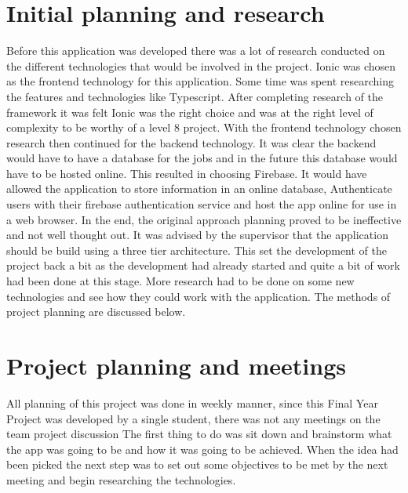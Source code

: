\section{Initial planning and research}
Before this application was developed there was a lot of research conducted on the different technologies that would be involved in the project. Ionic was chosen as the frontend technology for this application. Some time was spent researching the features and technologies like Typescript. After completing research of the framework it was felt Ionic was the right choice and was at the right level of complexity to be worthy of a level 8 project.
With the frontend technology chosen research then continued for the backend technology. It was clear the backend would have to have a database for the jobs and in the future this database would have to be hosted online. This resulted in choosing Firebase. It would have allowed the application to store information in an online database, Authenticate users with their firebase authentication service and host the app online for use in a web browser.
In the end, the original approach planning proved to be ineffective and not well thought out. It was advised by the supervisor that the application should be build using a three tier architecture. This set the development of the project back a bit  as the development had already started and quite a bit of work had been done at this stage. More research had to be done on some new technologies and see how they could work with the application. The methods of project planning are discussed below.

\section{Project planning and meetings}
All planning of this project was done in weekly manner, since this Final Year Project was developed by a single student, there was not any meetings on the team project discussion The first thing to do was sit down and brainstorm what the app was going to be and how it was going to be achieved. When the idea had been picked the next step was to set out some objectives to be met by the next meeting and begin researching the technologies.

